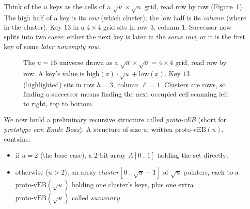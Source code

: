 \begin{intuitionbox}
Think of the $u$ keys as the cells of a $\sqrt{u} \times \sqrt{u}$ grid, read
row by row (Figure~\ref{ch21:grid}). The high half of a key is its \emph{row}
(which cluster); the low
half is its \emph{column} (where in the cluster). Key $13$ in a $4\times 4$ grid
sits in row $3$, column $1$. Successor now splits into two cases: either the
next key is later in the \emph{same row}, or it is the first key of some
\emph{later nonempty row}.
\end{intuitionbox}

\begin{figure}[htbp]
\centering
{}
\caption{The $u=16$ universe drawn as a $\sqrt{u}\times\sqrt{u}=4\times4$ grid,
read row by row. A key's value is $\mathrm{high}(x)\cdot\sqrt u+\mathrm{low}(x)$. Key
$13$ (highlighted) sits in row $h=3$, column $\ell=1$. Clusters are rows, so
finding a successor means finding the next occupied cell scanning left to right, top to bottom.}
\label{ch21:grid}
\end{figure}

We now build a preliminary recursive structure called \emph{proto-vEB} (short for \emph{prototype van Emde Boas}). A structure of
size $u$, written $\text{proto-vEB}(u)$, contains:

\begin{itemize}
  \item if $u = 2$ (the base case), a $2$-bit array $A[0\,..\,1]$ holding the
        set directly;
  \item otherwise ($u > 2$), an array $\mathit{cluster}[0\,..\,\sqrt{u}-1]$ of
        $\sqrt{u}$ pointers, each to a $\text{proto-vEB}(\sqrt{u})$ holding one
        cluster's keys, plus one extra
        $\text{proto-vEB}(\sqrt{u})$ called $\mathit{summary}$.
\end{itemize}

